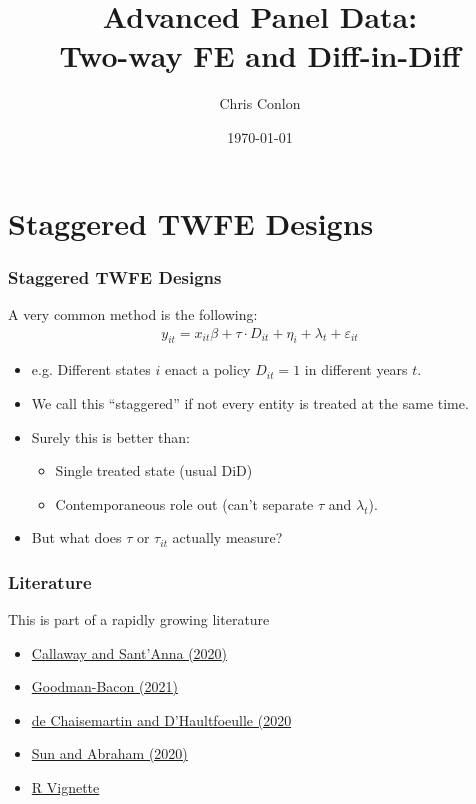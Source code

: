 \documentclass[xcolor=pdftex,dvipsnames,table,mathserif,aspectratio=169]{beamer}
\title{ Advanced Panel Data:\\
Two-way FE and Diff-in-Diff}
\author{Chris Conlon }
\institute{NYU Stern }
\date{\today}
\begin{document}
\maketitle

\section*{Staggered TWFE Designs}

\begin{frame}
\frametitle{Staggered TWFE Designs}
A very common method is the following:
\begin{align*}
y_{it} = x_{it} \beta + \tau\cdot  D_{it} + \eta_i + \lambda_t + \varepsilon_{it}
\end{align*}

\begin{itemize}
\item e.g. Different states $i$ enact a policy $D_{it}=1$ in different years $t$.
\item We call this ``staggered'' if not every entity is treated at the same time.
\item Surely this is better than:
\begin{itemize}
\item Single treated state (usual DiD)
\item Contemporaneous role out (can't separate $\tau$ and $\lambda_t$).
\end{itemize}
\item But what does $\tau$ or $\tau_{it}$ actually measure?
\end{itemize}
\end{frame}


\begin{frame}
\frametitle{Literature}
This is part of a rapidly growing literature
\begin{itemize}
\item \href{https://www.sciencedirect.com/science/article/pii/S0304407620303948}{Callaway and Sant'Anna (2020)}
\item \href{http://goodman-bacon.com/pdfs/ddtiming.pdf}{Goodman-Bacon (2021)}
\item \href{https://www.aeaweb.org/articles?id=10.1257/aer.20181169}{de Chaisemartin and D'Haultfoeulle (2020}
\item \href{https://arxiv.org/abs/1804.05785}{Sun and Abraham (2020)}
\item \href{https://bcallaway11.github.io/did/}{R Vignette}
\end{itemize}
\end{frame}
\end{document}
